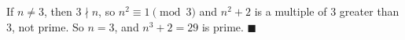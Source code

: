 If $n\ne3$, then $3\nmid n$, so $n^2\equiv1\pmod3$ and $n^2+2$ is a multiple of $3$ greater than $3$, not prime. So $n=3$, and $n^3+2=29$ is prime. $\blacksquare$
